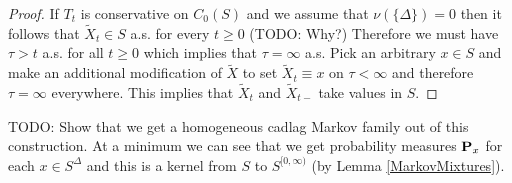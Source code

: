 \begin{proof}
If $T_t$ is conservative on $C_0(S)$ and we assume that $\nu(\lbrace \Delta \rbrace) = 0$ then it follows that $\tilde{X}_t \in S$ a.s. for every $t \geq 0$ (TODO: Why?)  Therefore we must have $\tau > t$ a.s. for all $t \geq 0$ which implies that $\tau = \infty$ a.s.  Pick an arbitrary $x \in S$ and make an additional modification of $\tilde{X}$ to set $\tilde{X}_t \equiv x$ on $\tau < \infty$ and therefore $\tau = \infty$ everywhere.  This implies that $\tilde{X}_t$ and $\tilde{X}_{t-}$ take values in $S$.
\end{proof}

TODO:  Show that we get a homogeneous cadlag Markov family out of this construction.  At a minimum we can see that we get probability measures $\textbf{P}_{x}$ for each $x \in S^\Delta$ and this is a kernel from $S$ to $S^{[0,\infty)}$ (by Lemma \ref{MarkovMixtures}).

